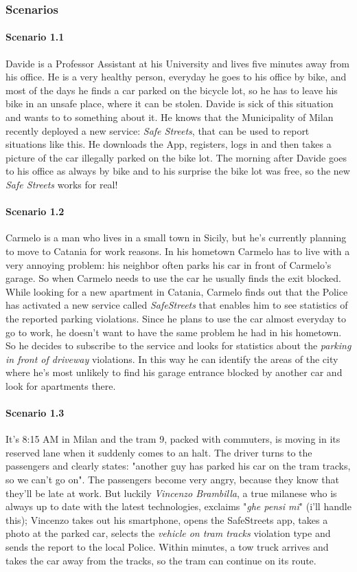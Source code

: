\subsubsection{Scenarios}

\paragraph{Scenario 1.1}
Davide is a Professor Assistant at his University and lives five minutes away
from his office. He is a very healthy person, everyday he goes to his office by
bike, and most of the days he finds a car parked on the bicycle lot, so he has
to leave his bike in an unsafe place, where it can be stolen. Davide is
sick of this situation and wants to to something about it. He knows that the
Municipality of Milan recently deployed a new service: \emph{Safe Streets}, that
can be used to report situations like this. He downloads the App, registers,
logs in and then takes a picture of the car illegally parked on the bike lot.
The morning after Davide goes to his office as always by bike and to his
surprise the bike lot was free, so the new \emph{Safe Streets} works for real!

\paragraph{Scenario 1.2}
Carmelo is a man who lives in a small town in Sicily, but he's currently
planning to move to Catania for work reasons. In his hometown Carmelo has to live
with a very annoying problem: his neighbor often parks his car in front of
Carmelo's garage. So when Carmelo needs to use the car he usually finds the
exit blocked.
While looking for a new apartment in Catania, Carmelo finds out that the
Police has activated a new service called \emph{SafeStreets} that enables him
to see statistics of the reported parking violations.
Since he plans to use the car almost everyday to go to work, he doesn't want to
have the same problem he had in his hometown. So he decides to subscribe to the
service and looks for statistics about the \emph{parking in front of driveway}
violations. In this way he can identify the areas of the city where he's most
unlikely to find his garage entrance blocked by another car and look for
apartments there.

\paragraph{Scenario 1.3}
It's 8:15 AM in Milan and the tram 9, packed with commuters, is moving
in its reserved lane when it suddenly comes to an halt. The driver turns to
the passengers and clearly states: "another guy has parked his car on the tram
tracks, so we can't go on".
The passengers become very angry, because they know that they'll be late at
work. But luckily \emph{Vincenzo Brambilla}, a true milanese who is always up to
date with the latest technologies, exclaims "\emph{ghe pensi mi}" (i'll handle
this);
Vincenzo takes out his smartphone, opens the SafeStreets app, takes a photo at
the parked car, selects the \emph{vehicle on tram tracks} violation type and
sends the report to the local Police.
Within minutes, a tow truck arrives and takes the car away from the tracks,
so the tram can continue on its route.
